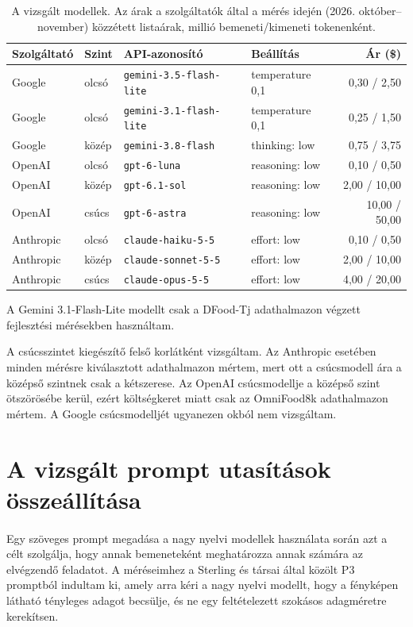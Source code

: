 \begin{table}[h]
\centering
\caption{A vizsgált modellek. Az árak a szolgáltatók által a mérés idején (2026.
október--november) közzétett listaárak, millió bemeneti/kimeneti tokenenként.}
\label{tab:modellek}
\begin{tabular}{llllr}
\hline
Szolgáltató & Szint & API-azonosító & Beállítás & Ár (\$) \\
\hline
Google    & olcsó & \texttt{gemini-3.5-flash-lite} & temperature 0,1 & 0,30 / 2,50 \\
Google    & olcsó & \texttt{gemini-3.1-flash-lite} & temperature 0,1 & 0,25 / 1,50 \\
Google    & közép & \texttt{gemini-3.8-flash} & thinking: low & 0,75 / 3,75 \\
OpenAI    & olcsó & \texttt{gpt-6-luna} & reasoning: low & 0,10 / 0,50 \\
OpenAI    & közép & \texttt{gpt-6.1-sol} & reasoning: low & 2,00 / 10,00 \\
OpenAI    & csúcs & \texttt{gpt-6-astra} & reasoning: low & 10,00 / 50,00 \\
Anthropic & olcsó & \texttt{claude-haiku-5-5} & effort: low & 0,10 / 0,50 \\
Anthropic & közép & \texttt{claude-sonnet-5-5} & effort: low & 2,00 / 10,00 \\
Anthropic & csúcs & \texttt{claude-opus-5-5} & effort: low & 4,00 / 20,00 \\
\hline
\end{tabular}
\end{table}

A Gemini 3.1-Flash-Lite modellt csak a DFood-Tj adathalmazon végzett fejlesztési mérésekben használtam.

A csúcsszintet kiegészítő felső korlátként vizsgáltam. 
Az Anthropic esetében minden mérésre kiválasztott adathalmazon mértem, 
mert ott a csúcsmodell ára a középső szintnek csak a kétszerese. 
Az OpenAI csúcsmodellje a középső szint ötszörösébe kerül, ezért költségkeret miatt csak az OmniFood8k adathalmazon mértem. 
A Google csúcsmodelljét ugyanezen okból nem vizsgáltam.

\section{A vizsgált prompt utasítások összeállítása}
\label{sec:promptok}
\paragraph{}Egy szöveges prompt megadása a nagy nyelvi modellek használata során azt a célt szolgálja,
hogy annak bemeneteként meghatározza annak számára az elvégzendő feladatot.
A méréseimhez a Sterling és társai \cite{sterling2026vlm} által közölt P3 promptból indultam ki,
amely arra kéri a  nagy nyelvi modellt, hogy a fényképen látható tényleges adagot becsülje, és
ne egy feltételezett szokásos adagméretre kerekítsen.
